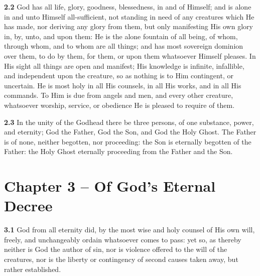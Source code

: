 \par\textbf{2.2} God has all life, glory, goodness, blessedness, in and of Himself; and is alone in and unto Himself all-sufficient, not standing in need of any creatures which He has made, nor deriving any glory from them, but only manifesting His own glory in, by, unto, and upon them: He is the alone fountain of all being, of whom, through whom, and to whom are all things; and has most sovereign dominion over them, to do by them, for them, or upon them whatsoever Himself pleases. In His sight all things are open and manifest; His knowledge is infinite, infallible, and independent upon the creature, so as nothing is to Him contingent, or uncertain. He is most holy in all His counsels, in all His works, and in all His commands. To Him is due from angels and men, and every other creature, whatsoever worship, service, or obedience He is pleased to require of them.    

\par\textbf{2.3} In the unity of the Godhead there be three persons, of one substance, power, and eternity; God the Father, God the Son, and God the Holy Ghost. The Father is of none, neither begotten, nor proceeding: the Son is eternally begotten of the Father: the Holy Ghost eternally proceeding from the Father and the Son.   


\section{Chapter 3 -- Of God's Eternal Decree} 

\par\textbf{3.1} God from all eternity did, by the most wise and holy counsel of His own will, freely, and unchangeably ordain whatsoever comes to pass: yet so, as thereby neither is God the author of sin, nor is violence offered to the will of the creatures, nor is the liberty or contingency of second causes taken away, but rather established.   


